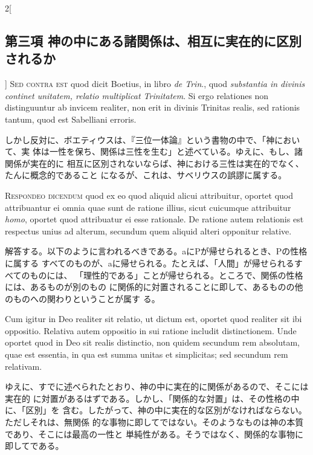 \documentclass[paper=a4paper,fontsize=10pt,jafontsize=9pt,titlepage]{jlreq}
\begin{document}
\begin{paracol}{2}[\subsection{第三項 神の中にある諸関係は、相互に実在的に区別されるか}]
{\scshape Sed contra est} quod dicit Boetius, in libro {\itshape de Trin}., quod
{\itshape substantia in divinis continet unitatem, relatio multiplicat
Trinitatem}. Si ergo relationes non distinguuntur ab invicem realiter, non erit
in divinis Trinitas realis, sed rationis tantum, quod est Sabelliani erroris.


\switchcolumn


しかし反対に、ボエティウスは、『三位一体論』という書物の中で、「神において、実
 体は一性を保ち、関係は三性を生む」と述べている。ゆえに、もし、諸関係が実在的に
 相互に区別されないならば、神における三性は実在的でなく、たんに概念的であること
 になるが、これは、サベリウスの誤謬に属する。




{\scshape Respondeo dicendum} quod ex eo quod aliquid alicui attribuitur,
oportet quod attribuantur ei omnia quae sunt de ratione illius, sicut cuicumque
attribuitur {\itshape homo}, oportet quod attribuatur ei esse rationale. De
ratione autem relationis est respectus unius ad alterum, secundum quem aliquid
alteri opponitur relative.


\switchcolumn


解答する。以下のように言われるべきである。aにPが帰せられるとき、Pの性格に属する
 すべてのものが、aに帰せられる。たとえば、「人間」が帰せられるすべてのものには、
 「理性的である」ことが帰せられる。ところで、関係の性格には、あるものが別のもの
 に関係的に対置されることに即して、あるものの他のものへの関わりということが属す
 る。


\switchcolumn*


Cum igitur in Deo realiter sit relatio, ut dictum est, oportet quod realiter sit
ibi oppositio. Relativa autem oppositio in sui ratione includit
distinctionem. Unde oportet quod in Deo sit realis distinctio, non quidem
secundum rem absolutam, quae est essentia, in qua est summa unitas et
simplicitas; sed secundum rem relativam.


\switchcolumn


ゆえに、すでに述べられたとおり、神の中に実在的に関係があるので、そこには実在的
 に対置があるはずである。しかし、「関係的な対置」は、その性格の中に、「区別」を
 含む。したがって、神の中に実在的な区別がなければならない。ただしそれは、無関係
 的な事物に即してではない。そのようなものは神の本質であり、そこには最高の一性と
 単純性がある。そうではなく、関係的な事物に即してである。



\end{paracol}
\end{document}
